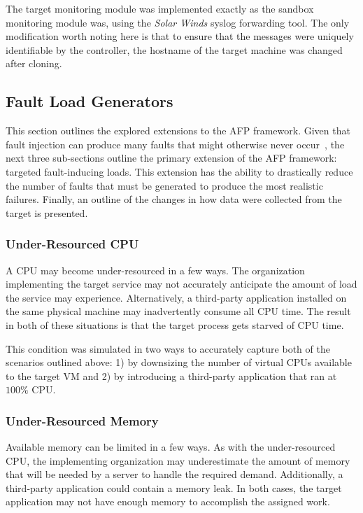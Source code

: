The target monitoring module was implemented exactly as the sandbox monitoring
module was, using the \emph{Solar Winds} syslog forwarding tool.  The only
modification worth noting here is that to ensure that the messages were
uniquely identifiable by the controller, the hostname of the target machine was
changed after cloning.

\setcounter{secnumdepth}{3}

\subsection{Fault Load Generators} \label{sec:extensions}
This section outlines the explored extensions to the \ac{AFP} framework.  Given
that fault injection can produce many faults that might otherwise never
occur~\citep{kikuchi2014,natella2016assessing}, the next three sub-sections
outline the primary extension of the \ac{AFP} framework: targeted
fault-inducing loads.  This extension has the ability to drastically reduce the
number of faults that must be generated to produce the most realistic failures.
Finally, an outline of the changes in how data were collected from the target
is presented.

\subsubsection{Under-Resourced \ac{CPU}} \label{sec:extUnderResourcedCPU}
A \ac{CPU} may become under-resourced in a few ways.  The organization
implementing the target service may not accurately anticipate the amount of
load the service may experience.  Alternatively, a third-party application
installed on the same physical machine may inadvertently consume all \ac{CPU}
time.  The result in both of these situations is that the target process gets
starved of \ac{CPU} time.

This condition was simulated in two ways to accurately capture both of the
scenarios outlined above:  1) by downsizing the number of virtual \ac{CPU}s
available to the target \ac{VM} and 2) by introducing a third-party application
that ran at $100\%$ \ac{CPU}.

\subsubsection{Under-Resourced Memory} \label{sec:extUnderResourcedMem}
Available memory can be limited in a few ways.  As with the under-resourced
\ac{CPU}, the implementing organization may underestimate the amount of memory
that will be needed by a server to handle the required demand.  Additionally, a
third-party application could contain a memory leak.  In both cases, the target
application may not have enough memory to accomplish the assigned work.

